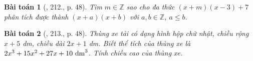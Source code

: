 \documentclass{article}
\newtheorem{baitoan}{Bài toán}
\begin{document}
\begin{baitoan}[\cite{Tuyen_Toan_7}, 212., p. 48]
	Tìm $m\in\mathbb{Z}$ sao cho đa thức $(x + m)(x - 3) + 7$ phân tích được thành $(x + a)(x + b)$ với $a,b\in\mathbb{Z}$, $a\le b$.
\end{baitoan}

\begin{baitoan}[\cite{Tuyen_Toan_7}, 213., p. 48]
	Thùng xe tải có dạng hình hộp chữ nhật, chiều rộng $x + 5$ \emph{dm}, chiều dài $2x + 1$ \emph{dm}. Biết thể tích của thùng xe là $2x^3 + 15x^2 + 27x + 10\ {\rm dm}^3$. Tính chiều cao của thùng xe.
\end{baitoan}


\printbibliography[heading=bibintoc]
	
\end{document}
